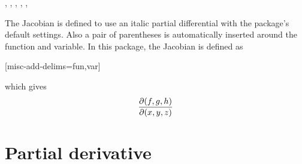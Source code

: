 \documentclass[final,british,10pt]{scrartcl}
\theoremstyle{remark}
\begin{document}
	\begin{function}{\jdv}
		\begin{syntax}
			\sarg, , , \targ{/}, , 
		\end{syntax}
		The Jacobian is defined to use an italic partial differential with the package's default settings. Also a pair of parentheses is automatically inserted around the function and variable. In this package, the Jacobian is defined as
		
		\begin{definition}
			\DeclareOdvVariant{\jdv}{\partial}[misc-add-delims={fun,var}]%
		\end{definition}
		
		\noindent which gives
		\begin{equation*}
		\jdv{f,g,h}{x,y,z}
		\end{equation*}
	\end{function}
	
	
	
	
	
	
	\clearpage	
	\section{Partial derivative}
	
\end{document}
